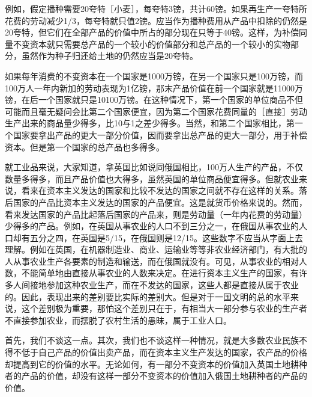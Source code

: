 例如，假定播种需要20夸特［小麦］，每夸特3镑，共计60镑。如果再生产一夸特所花费的劳动减少1/3，每夸特就只值2镑。应当作为播种费用从产品中扣除的仍然是20夸特，但它们在全部产品的价值中所占的部分现在只等于40镑。这样，为补偿同量不变资本就只需要总产品的一个较小的价值部分和总产品的一个较小的实物部分，虽然作为种子归还给土地的仍然应当是20夸特。

如果每年消费的不变资本在一个国家是1000万镑，在另一个国家只是100万镑，而100万人一年内新加的劳动表现为1亿镑，那末产品价值在前一个国家就是11000万镑，在后一个国家就只是10100万镑。在这种情况下，第一个国家的单位商品不但可能而且毫无疑问会比第二个国家便宜，因为第二个国家花费同量的［直接］劳动生产出来的商品量少得多，比10与1之差少得多。当然，和第二个国家相比，第一个国家要拿出产品的更大一部分价值，因而要拿出总产品的更大一部分，用于补偿资本。但是第一个国家的总产品也多得多。

就工业品来说，大家知道，拿英国比如说同俄国相比，100万人生产的产品，不仅数量多得多，而且产品价值也大得多，虽然英国的单位商品便宜得多。但就农业来说，看来在资本主义发达的国家和比较不发达的国家之间就不存在这样的关系。落后国家的产品比资本主义发达的国家的产品便宜。这是就货币价格来说的。然而，看来发达国家的产品比起落后国家的产品来，则是劳动量（一年内花费的劳动量）少得多的产品。例如，在英国从事农业的人口不到三分之一，在俄国从事农业的人口却有五分之四，在英国是5/15，在俄国则是12/15。这些数字不应当从字面上去理解。例如在英国，在机器制造业、商业、运输业等等非农业经济部门，有大批的人从事农业生产各要素的制造和输送，而在俄国就没有。可见，从事农业的相对人数，不能简单地由直接从事农业的人数来决定。在进行资本主义生产的国家，有许多人间接地参加这种农业生产，而在不发达的国家，这些人都是直接从属于农业的。因此，表现出来的差别要比实际的差别大。但是对于一国文明的总的水平来说，这个差别极为重要，那怕这个差别只在于，有相当大一部分参与农业的生产者不直接参加农业，而摆脱了农村生活的愚昧，属于工业人口。

首先，我们不谈这一点。其次，我们也不谈这样一种情况，就是大多数农业民族不得不低于自己产品的价值出卖产品，而在资本主义生产发达的国家，农产品的价格却提高到它的价值的水平。无论如何，有一部分不变资本的价值加入英国土地耕种者的产品的价值，却没有这样一部分不变资本的价值加入俄国土地耕种者的产品的价值。

